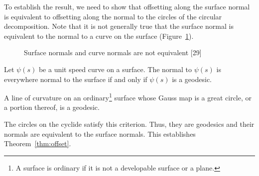 {To establish the result, 
we need to show that offsetting along the surface normal is equivalent
to offsetting along the normal to the circles of the circular decomposition.
Note that it is not generally true that the surface normal is equivalent 
to the normal to a curve on the surface
(Figure~\ref{normal}).


\begin{figure}
\vspace{2in}
\caption{Surface normals and curve normals are not equivalent [29]}
\label{normal}
\end{figure}

\begin{lemma}
\cite{MP77}
Let $\psi(s)$ be a unit speed curve on a surface.
The normal to $\psi(s)$ is everywhere normal to the surface if and only if
$\psi(s)$ is a geodesic.
\end{lemma}

\begin{lemma}
\label{lem:grau}
\cite{GRAU47}
A line of curvature on an ordinary\footnote{A surface is ordinary if it
	is not a developable surface or a plane.}
surface whose Gauss map is a great circle, or a portion thereof, is a geodesic.
\end{lemma}



The circles on the cyclide satisfy this criterion.
Thus, they are geodesics and their normals are equivalent to the surface
normals.
This establishes Theorem~\ref{thm:offset}.





}
